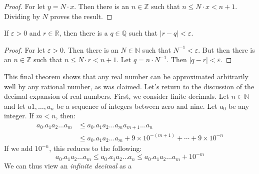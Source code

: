             \begin{proof}
                For let $y=N\cdot{x}$. Then there is an
                $n\in\mathbb{Z}$ such that
                $n\leq{N}\cdot{x}<n+1$. Dividing by $N$ proves
                the result.
            \end{proof}
            \begin{theorem}
                If $\varepsilon>0$ and $r\in\mathbb{R}$, then
                there is a $q\in\mathbb{Q}$ such that
                $|r-q|<\varepsilon$.
            \end{theorem}
            \begin{proof}
                For let $\varepsilon>0$. Then there is an
                $N\in\mathbb{N}$ such that
                $N^{\minus{1}}<\varepsilon$. But then there is
                an $n\in\mathbb{Z}$ such that
                $n\leq{N}\cdot{r}<n+1$. Let
                $q=n\cdot{N}^{\minus{1}}$. Then
                $|q-r|<\varepsilon$.
            \end{proof}
            This final theorem shows that any real number can
            be approximated arbitrarily well by any rational number,
            as was claimed. Let's return to the discussion of
            the decimal expansion of real numbers. First, we
            consider finite decimals. Let $n\in\mathbb{N}$ and
            let $a{1},\dots,a_{n}$ be a sequence of integers between
            zero and nine. Let $a_{0}$ be any integer. If
            $m<n$, then:
            \begin{equation}
                \begin{split}
                    a_{0}.a_{1}a_{2}\dots{a}_{m}&\leq
                    a_{0}.a_{1}a_{2}\dots{a}_{m}a_{m+1}
                    \dots{a}_{n}\\
                    &\leq
                    a_{0}.a_{1}a_{2}\dots{a}_{m}
                    +9\times{10}^{\minus(m+1)}+\cdots
                    +9\times{10}^{\minus{n}}
                \end{split}
            \end{equation}
            If we add $10^{\minus{n}}$, this reduces to the
            following:
            \begin{equation}
                a_{0}.a_{1}a_{2}\dots{a}_{m}\leq
                a_{0}.a_{1}a_{2}\dots{a}_{n}\leq
                a_{0}.a_{1}a_{2}\dots{a}_{m}+10^{\minus{m}}
            \end{equation}
            We can thus view an \textit{infinite decimal} as a
